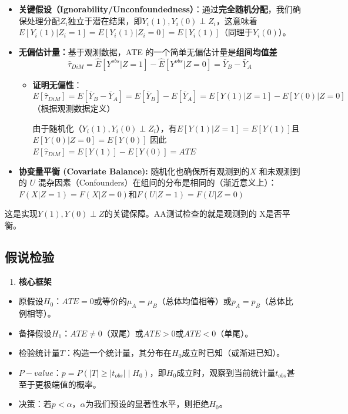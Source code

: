 \documentclass[
  letterpaper,
  DIV=11,
  numbers=noendperiod]{scrreprt}
\providecommand{\tightlist}{%
  \setlength{\itemsep}{0pt}\setlength{\parskip}{0pt}}
\begin{document}
\begin{itemize}
\item
  \textbf{关键假设（Ignorability/Unconfoundedness）}：通过\textbf{完全随机分配}，我们确保处理分配\(Z_i\)独立于潜在结果，即\(Y_i(1),Y_i(0) \perp Z_i\)，这意味着\(E[Y_i(1) | Z_i=1] = E[Y_i(1) | Z_i=0] = E[Y_i(1)]\)（同理于\(Y_i(0)\)）。
\item
  \textbf{无偏估计量：}基于观测数据，ATE
  的一个简单无偏估计量是\textbf{组间均值差}\[\hat{τ}_{DiM} = \hat{E}[Y^{obs} | Z=1] - \hat{E}[Y^{obs} | Z=0] = \bar{Y}_B - \bar{Y}_A\]

  \begin{itemize}
  \item
    \textbf{证明无偏性}：
    \[E[\hat{τ}_{DiM}] = E[\bar{Y}_B - \bar{Y}_A] = E[\bar{Y}_B] - E[\bar{Y}_A] = E[Y(1) | Z=1] - E[Y(0) | Z=0]\]（根据观测数据定义）

    由于随机化（\(Y_i(1),Y_i(0) \perp Z_i\)），有\(E[Y(1) | Z=1] = E[Y(1)]\)且\(E[Y(0) | Z=0] = E[Y(0)]\)
    因此\(E[\hat{τ}_{DiM}] = E[Y(1)] - E[Y(0)] = ATE\)
  \end{itemize}
\item
  \textbf{协变量平衡 (Covariate Balance):} 随机化也确保所有观测到的\(X\)
  和未观测到的 \(U\)
  混杂因素（Confounders）在组间的分布是相同的（渐近意义上）：
  \(F(X | Z=1) = F(X | Z=0)\)和\(F(U | Z=1) = F(U | Z=0)\)
\end{itemize}

这是实现\(Y(1),Y(0) \perp Z\)的关键保障。AA测试检查的就是观测到的
X是否平衡。

\subsection{假说检验}\label{ux5047ux8bf4ux68c0ux9a8c}

\begin{enumerate}
\def\labelenumi{\arabic{enumi}.}
\tightlist
\item
  \textbf{核心框架}
\end{enumerate}

\begin{itemize}
\item
  原假设\(H_0\)：\(ATE = 0\)或等价的\(\mu_A = \mu_B\)（总体均值相等）或\(p_A = p_B\)（总体比例相等）。
\item
  备择假设\(H_1\)：\(ATE \neq 0\)（双尾）或\(ATE>0\)或\(ATE<0\)（单尾）。
\item
  检验统计量\(T\)：构造一个统计量，其分布在\(H_0\)成立时已知（或渐进已知）。
\item
  \(P-value\)：\(p=P\left(|T| \geq \left|t_{obs}\right| \middle| H_0\right)\)，即\(H_0\)成立时，观察到当前统计量\(t_{obs}\)甚至于更极端值的概率。
\item
  决策：若\(p<\alpha\)，\(\alpha\)为我们预设的显著性水平，则拒绝\(H_0\)。
\end{itemize}
\end{document}
